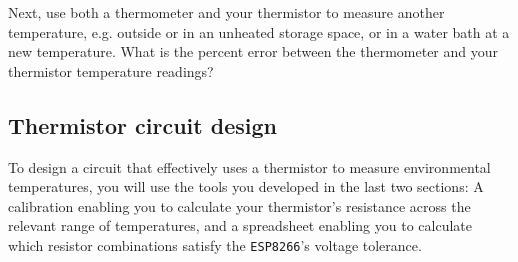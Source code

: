 \begin{enumerate}
	\smallskip
	Next, use both a thermometer and your thermistor to measure another temperature, e.g. outside or in an unheated storage space, or in a water bath at a new temperature. 
	What is the percent error between the thermometer and your thermistor temperature readings? 
	
\end{enumerate}


\subsection{Thermistor circuit design}
To design a circuit that effectively uses a thermistor to measure environmental temperatures, you will use the tools you developed in the last two sections: A calibration enabling you to calculate your thermistor's resistance across the relevant range of temperatures, and a spreadsheet enabling you to calculate which resistor combinations satisfy the \texttt{ESP8266}'s \adc voltage tolerance.

